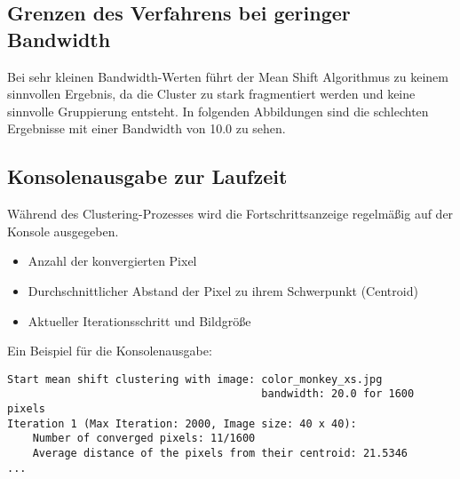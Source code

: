 \begin{minipage}[t]{0.45\linewidth}
\end{minipage}
%
\begin{minipage}[t]{0.45\linewidth}
\end{minipage}

\newpage

\subsection*{Grenzen des Verfahrens bei geringer Bandwidth}

Bei sehr kleinen Bandwidth-Werten führt der Mean Shift Algorithmus zu keinem sinnvollen Ergebnis, da die Cluster zu stark fragmentiert werden und keine sinnvolle Gruppierung entsteht. In folgenden Abbildungen sind die schlechten Ergebnisse mit einer Bandwidth von 10.0 zu sehen.

\begin{minipage}[t]{0.45\linewidth}
\end{minipage}
%
\begin{minipage}[t]{0.45\linewidth}
\end{minipage}


\subsection*{Konsolenausgabe zur Laufzeit}

Während des Clustering-Prozesses wird die Fortschrittsanzeige regelmäßig auf der Konsole ausgegeben.

\begin{itemize}
    \item Anzahl der konvergierten Pixel
    \item Durchschnittlicher Abstand der Pixel zu ihrem Schwerpunkt (Centroid)
    \item Aktueller Iterationsschritt und Bildgröße
\end{itemize}

Ein Beispiel für die Konsolenausgabe:

\begin{verbatim}
Start mean shift clustering with image: color_monkey_xs.jpg
                                        bandwidth: 20.0 for 1600 pixels
Iteration 1 (Max Iteration: 2000, Image size: 40 x 40):
    Number of converged pixels: 11/1600
    Average distance of the pixels from their centroid: 21.5346
...
\end{verbatim}

\newpage
